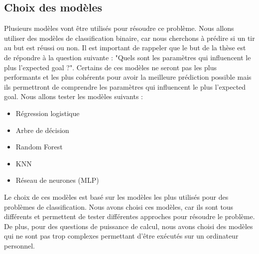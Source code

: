 \documentclass[12pt]{article}
\begin{document}
\subsection{Choix des modèles}
Plusieurs modèles vont être utilisés pour résoudre ce problème.
Nous allons utiliser des modèles de classification binaire, car nous cherchons à prédire si un tir au but est réussi ou non.
Il est important de rappeler que le but de la thèse est de répondre à la question suivante : "Quels sont les paramètres qui influencent le plus l'expected goal ?".
Certains de ces modèles ne seront pas les plus performants et les plus cohérents pour avoir la meilleure prédiction possible mais ils permettront de comprendre les paramètres qui influencent le plus l'expected goal.
Nous allons tester les modèles suivants :
\begin{itemize}
    \item Régression logistique
    \item Arbre de décision
    \item Random Forest
    \item KNN
    \item Réseau de neurones (MLP)
\end{itemize}
Le choix de ces modèles est basé sur les modèles les plus utilisés pour des problèmes de classification.
Nous avons choisi ces modèles, car ils sont tous différents et permettent de tester différentes approches pour résoudre le problème.
De plus, pour des questions de puissance de calcul, nous avons choisi des modèles qui ne sont pas trop complexes permettant d'être exécutés sur un ordinateur personnel.
\end{document}
